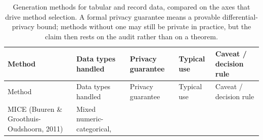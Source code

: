 \documentclass[
  letterpaper,
  11pt]{scrbook}
\begin{document}
\begin{longtable}[]{@{}
  >{\raggedright\arraybackslash}p{}
  >{\raggedright\arraybackslash}p{}
  >{\raggedright\arraybackslash}p{}
  >{\raggedright\arraybackslash}p{}
  >{\raggedright\arraybackslash}p{}@{}}
\caption{Generation methods for tabular and record data, compared on the
axes that drive method selection. A formal privacy guarantee means a
provable differential-privacy bound; methods without one may still be
private in practice, but the claim then rests on the audit rather than
on a theorem.}\label{tbl-methods}\tabularnewline
\toprule\noalign{}
\begin{minipage}[b]{\linewidth}\raggedright
Method
\end{minipage} & \begin{minipage}[b]{\linewidth}\raggedright
Data types handled
\end{minipage} & \begin{minipage}[b]{\linewidth}\raggedright
Privacy guarantee
\end{minipage} & \begin{minipage}[b]{\linewidth}\raggedright
Typical use
\end{minipage} & \begin{minipage}[b]{\linewidth}\raggedright
Caveat / decision rule
\end{minipage} \\
\midrule\noalign{}
\endfirsthead
\toprule\noalign{}
\begin{minipage}[b]{\linewidth}\raggedright
Method
\end{minipage} & \begin{minipage}[b]{\linewidth}\raggedright
Data types handled
\end{minipage} & \begin{minipage}[b]{\linewidth}\raggedright
Privacy guarantee
\end{minipage} & \begin{minipage}[b]{\linewidth}\raggedright
Typical use
\end{minipage} & \begin{minipage}[b]{\linewidth}\raggedright
Caveat / decision rule
\end{minipage} \\
\midrule\noalign{}
\endhead
\bottomrule\noalign{}
\endlastfoot
MICE (Buuren \& Groothuis-Oudshoorn, 2011) & Mixed numeric-categorical,

\end{longtable}
\end{document}
